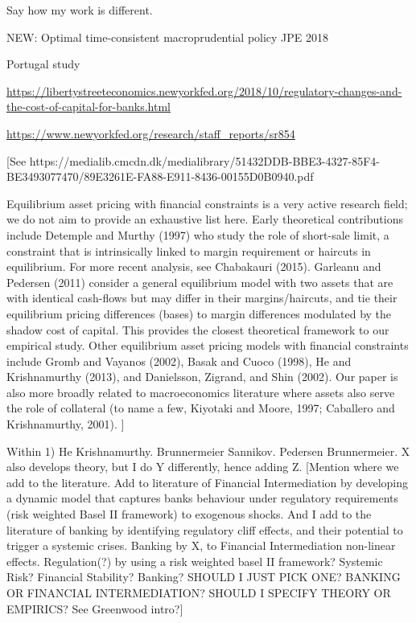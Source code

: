 \documentclass[11pt]{article}
\begin{document}
\begin{appendices}
Say how my work is different.

NEW: Optimal time-consistent macroprudential policy JPE 2018

Portugal study

\url{https://libertystreeteconomics.newyorkfed.org/2018/10/regulatory-changes-and-the-cost-of-capital-for-banks.html}

\url{https://www.newyorkfed.org/research/staff_reports/sr854}

[See https://medialib.cmcdn.dk/medialibrary/51432DDB-BBE3-4327-85F4-BE3493077470/89E3261E-FA88-E911-8436-00155D0B0940.pdf

Equilibrium asset pricing with financial constraints is a very
active research field; we do not aim to provide an exhaustive list here. Early theoretical
contributions include Detemple and Murthy (1997) who study the role of short-sale limit,
a constraint that is intrinsically linked to margin requirement or haircuts in equilibrium.
For more recent analysis, see Chabakauri (2015). Garleanu and Pedersen (2011) consider
a general equilibrium model with two assets that are with identical cash-flows but may differ in their margins/haircuts, and tie their equilibrium pricing differences (bases) to
margin differences modulated by the shadow cost of capital. This provides the closest
theoretical framework to our empirical study. Other equilibrium asset pricing models
with financial constraints include Gromb and Vayanos (2002), Basak and Cuoco (1998),
He and Krishnamurthy (2013), and Danielsson, Zigrand, and Shin (2002). Our paper is also more broadly related to macroeconomics literature where assets also serve the role
of collateral (to name a few, Kiyotaki and Moore, 1997; Caballero and Krishnamurthy, 2001).
]


Within 1) He Krishnamurthy. Brunnermeier Sannikov. Pedersen Brunnermeier. 
X also develops theory, but I do Y differently, hence adding Z.
[Mention where we add to the literature. Add to literature of Financial Intermediation by developing a dynamic model that captures banks behaviour under regulatory requirements (risk weighted Basel II framework) to exogenous shocks. And I add to the literature of banking by identifying regulatory cliff effects, and their potential to trigger a systemic crises. Banking by X, to Financial Intermediation non-linear effects. Regulation(?) by using a risk weighted basel II framework? Systemic Risk? Financial Stability? Banking? SHOULD I JUST PICK ONE? BANKING OR FINANCIAL INTERMEDIATION? SHOULD I SPECIFY THEORY OR EMPIRICS? See Greenwood intro?]


\end{appendices}
\end{document}
